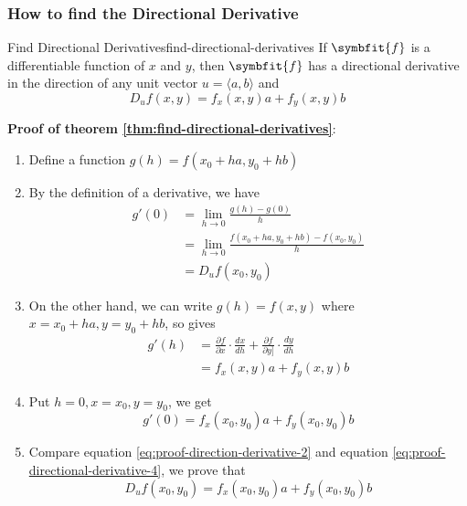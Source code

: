 \documentclass[math,code]{amznotes}
\theoremstyle{remark}
\begin{document}
\subsubsection{How to find the Directional Derivative}
\begin{thmbox}{Find Directional Derivatives}{find-directional-derivatives}
    If $\symbfit{f}$ is a differentiable function of $x$ and $y$, then $\symbfit{f}$ has a directional derivative in the direction of any unit vector $u=\langle a,b \rangle$ and
    \begin{displaymath}
        D_uf(x,y)=f_x(x,y)a+f_y(x,y)b
    \end{displaymath}
\end{thmbox}
\textbf{Proof of theorem \ref{thm:find-directional-derivatives}}: \newline
\begin{enumerate}
    \item Define a function $g(h)=f(x_0+ha, y_0+hb)$
    \item By the definition of a derivative, we have
    \begin{align}
        g'(0)&=\lim\limits_{h \to 0}\frac{g(h)-g(0)}{h} \\
        &=\lim\limits_{h \to 0}\frac{f(x_0+ha, y_0+hb)-f(x_0,y_0)}{h} \\
        &=D_uf(x_0,y_0) \label{eq:proof-direction-derivative-2}
    \end{align}
    \item On the other hand, we can write $g(h)=f(x,y)$ where $x=x_0+ha, y=y_0+hb$, so  gives
    \begin{align*}
        g'(h)&=\frac{\partial f}{\partial x} \cdot \frac{dx}{dh} + \frac{\partial f}{\partial y]} \cdot \frac{dy}{dh} \\
        &=f_x(x,y)a+f_y(x,y)b
    \end{align*}
    \item Put $h=0, x=x_0, y=y_0$, we get
    \begin{equation} \label{eq:proof-directional-derivative-4}
        g'(0)=f_x(x_0,y_0)a + f_y(x_0,y_0)b
    \end{equation}
    \item Compare equation \eqref{eq:proof-direction-derivative-2} and equation \eqref{eq:proof-directional-derivative-4}, we prove that
    \begin{equation} \label{eq:directional-derivative-equation}
        D_uf(x_0,y_0)=f_x(x_0,y_0)a+f_y(x_0,y_0)b
    \end{equation}
\end{enumerate}
\end{document}
